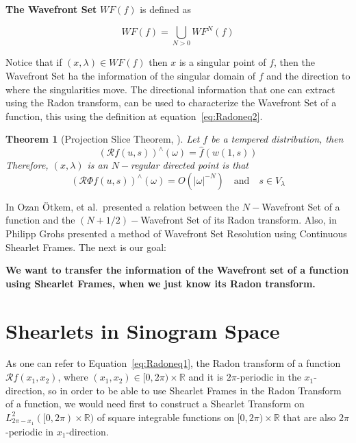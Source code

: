 \documentclass[a4paper]{article}
\newtheorem{theorem}{Theorem}
\begin{document}
\textbf{The Wavefront Set} $WF(f)$ is defined as 

\begin{equation}
\label{eq:Wavefront-set}
WF(f)=\bigcup_{N>0}WF^N(f)
\end{equation}

Notice that if $(x,\lambda)\in WF(f)$ then $x$ is a singular point of $f$, then the Wavefront Set ha the information of the singular domain of $f$ and the direction to where the singularities move. The directional information that one can extract using the Radon transform, can be used to characterize the Wavefront Set of a function, this using the definition at equation~\ref{eq:Radoneq2}.

\begin{theorem}[Projection Slice Theorem, \cite{WaveFrontSetGrohs}]
\label{thm:proj-slice}
Let $f$ be a tempered distribution, then
$$
(\mathcal{R}f(u,s))^{\wedge}(\omega)=\hat{f}(w(1,s))
$$
Therefore, $(x,\lambda)$ is an $N-$regular directed point is that
$$
(\mathcal{R}\Phi f(u,s))^{\wedge}(\omega)=O(|\omega|^{-N}) \quad \text{and}\quad s\in V_{\lambda}
$$
\end{theorem}

In \cite{Ozan-tomography} Ozan \"Otkem, et al.\ presented a relation between the $N-$Wavefront Set of a function and the $(N+1/2)-$Wavefront Set of its Radon transform. Also, in \cite{WaveFrontSetGrohs} Philipp Grohs presented a method of Wavefront Set Resolution using Continuous Shearlet Frames. The next is our goal:

\bigskip

\textbf{We want to transfer the information of the Wavefront set of a function using Shearlet Frames, when we just know its Radon transform.}


\section{Shearlets in Sinogram Space}

As one can refer to Equation~\ref{eq:Radoneq1}, the Radon transform of a function $\mathcal{R}f(x_1,x_2)$, where $(x_1,x_2)\in [0,2\pi)\times \mathbb{R}$ and it is $2\pi$-periodic in the $x_1$-direction, so in order to be able to use Shearlet Frames in the Radon Transform of a function, we would need first to construct a Shearlet Transform on $L^2_{2\pi-x_1}([0,2\pi)\times \mathbb{R})$ of square integrable functions on $[0,2\pi)\times \mathbb{R}$ that are also $2\pi$-periodic in $x_1$-direction. 
\bigskip 
\end{document}
